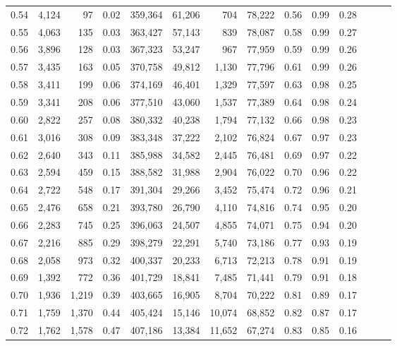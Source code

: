 \begin{tabular}{rrrrrrrrrrrrrr}
0.54 &  4,124 &     97 &  0.02 &  359,364 &   61,206 &     704 &  78,222 &  0.56 &  0.99 &      0.28 \\
0.55 &  4,063 &    135 &  0.03 &  363,427 &   57,143 &     839 &  78,087 &  0.58 &  0.99 &      0.27 \\
0.56 &  3,896 &    128 &  0.03 &  367,323 &   53,247 &     967 &  77,959 &  0.59 &  0.99 &      0.26 \\
0.57 &  3,435 &    163 &  0.05 &  370,758 &   49,812 &   1,130 &  77,796 &  0.61 &  0.99 &      0.26 \\
0.58 &  3,411 &    199 &  0.06 &  374,169 &   46,401 &   1,329 &  77,597 &  0.63 &  0.98 &      0.25 \\
0.59 &  3,341 &    208 &  0.06 &  377,510 &   43,060 &   1,537 &  77,389 &  0.64 &  0.98 &      0.24 \\
0.60 &  2,822 &    257 &  0.08 &  380,332 &   40,238 &   1,794 &  77,132 &  0.66 &  0.98 &      0.23 \\
0.61 &  3,016 &    308 &  0.09 &  383,348 &   37,222 &   2,102 &  76,824 &  0.67 &  0.97 &      0.23 \\
0.62 &  2,640 &    343 &  0.11 &  385,988 &   34,582 &   2,445 &  76,481 &  0.69 &  0.97 &      0.22 \\
0.63 &  2,594 &    459 &  0.15 &  388,582 &   31,988 &   2,904 &  76,022 &  0.70 &  0.96 &      0.22 \\
0.64 &  2,722 &    548 &  0.17 &  391,304 &   29,266 &   3,452 &  75,474 &  0.72 &  0.96 &      0.21 \\
0.65 &  2,476 &    658 &  0.21 &  393,780 &   26,790 &   4,110 &  74,816 &  0.74 &  0.95 &      0.20 \\
0.66 &  2,283 &    745 &  0.25 &  396,063 &   24,507 &   4,855 &  74,071 &  0.75 &  0.94 &      0.20 \\
0.67 &  2,216 &    885 &  0.29 &  398,279 &   22,291 &   5,740 &  73,186 &  0.77 &  0.93 &      0.19 \\
0.68 &  2,058 &    973 &  0.32 &  400,337 &   20,233 &   6,713 &  72,213 &  0.78 &  0.91 &      0.19 \\
0.69 &  1,392 &    772 &  0.36 &  401,729 &   18,841 &   7,485 &  71,441 &  0.79 &  0.91 &      0.18 \\
0.70 &  1,936 &  1,219 &  0.39 &  403,665 &   16,905 &   8,704 &  70,222 &  0.81 &  0.89 &      0.17 \\
0.71 &  1,759 &  1,370 &  0.44 &  405,424 &   15,146 &  10,074 &  68,852 &  0.82 &  0.87 &      0.17 \\
0.72 &  1,762 &  1,578 &  0.47 &  407,186 &   13,384 &  11,652 &  67,274 &  0.83 &  0.85 &      0.16 \\

\end{tabular}
